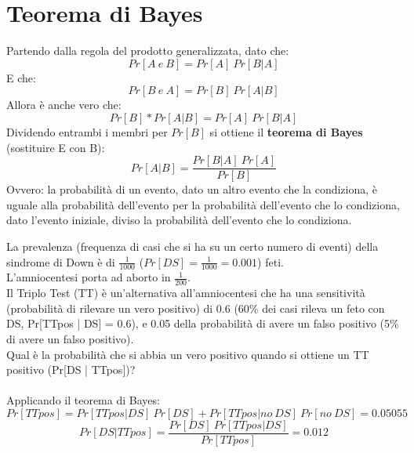 \documentclass[10pt, draft]{book}
\newcounter{example}[section]
\begin{document}
\section{Teorema di Bayes}
Partendo dalla regola del prodotto generalizzata, dato che:
\begin{equation}
    Pr[A\ e\ B] = Pr[A]\ Pr[B|A] 
\end{equation}
E che:
\begin{equation}
    Pr[B\ e\ A] = Pr[B]\ Pr[A|B] 
\end{equation}
Allora è anche vero che:
\begin{equation}
    Pr[B] * Pr[A|B] = Pr[A]\ Pr[B|A] 
\end{equation}
Dividendo entrambi i membri per $Pr[B]$ si ottiene il \textbf{teorema di Bayes} (sostituire E con B):
\begin{equation}
    Pr[A|B] = \frac{Pr[B|A]\ Pr[A]}{Pr[B]}
\end{equation}
Ovvero: la probabilità di un evento, dato un altro evento che la condiziona, è uguale alla probabilità dell'evento per la probabilità dell'evento che lo condiziona, dato l'evento iniziale, diviso la probabilità dell'evento che lo condiziona.
\begin{example}
    La prevalenza (frequenza di casi che si ha su un certo numero di eventi) della sindrome di Down è di $\frac{1}{1000}$ ($Pr[DS] = \frac{1}{1000} = 0.001$) feti.
    \\
    L'amniocentesi porta ad aborto in $\frac{1}{200}$.
    \\
    Il Triplo Test (TT) è un'alternativa all'amniocentesi che ha una sensitività (probabilità di rilevare un vero positivo) di 0.6 (60\% dei casi rileva un feto con DS, Pr[TTpos | DS] = 0.6), e 0.05 della probabilità di avere un falso positivo (5\% di avere un falso positivo).
    \\
    Qual è la probabilità che si abbia un vero positivo quando si ottiene un TT positivo (Pr[DS | TTpos])?
    \\
    \\
    Applicando il teorema di Bayes:
    \begin{equation}
        Pr[TTpos] = Pr[TTpos | DS]\ Pr[DS] + Pr[TTpos | no\ DS]\ Pr[no\ DS] = 0.05055
    \end{equation}
    \begin{equation}
        Pr[DS | TTpos] = \frac{Pr[DS]\ Pr[TTpos | DS]}{Pr[TTpos]}= 0.012
    \end{equation}
\end{example}
\end{document}

